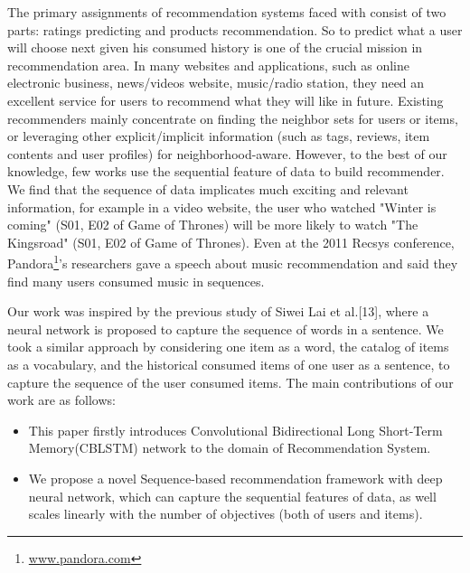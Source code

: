 \documentclass[runningheads]{llncs}
\begin{document}
The primary assignments of recommendation systems faced with consist of two parts: ratings predicting and products recommendation. So to predict what a user will choose next given his consumed history is one of the crucial mission \cite{15} in recommendation area. In many websites and applications, such as online electronic business, news/videos website, music/radio station, they need an excellent service for users to recommend what they will like in future. Existing recommenders mainly concentrate on finding the neighbor sets for users or items, or leveraging other explicit/implicit information (such as tags, reviews, item contents and user profiles) for neighborhood-aware. However, to the best of our knowledge, few works use the sequential feature of data to build recommender. We find that the sequence of data implicates much exciting and relevant information, for example in a video website, the user who watched "Winter is coming" (S01, E02 of Game of Thrones) will be more likely to watch "The Kingsroad" (S01, E02 of Game of Thrones). Even at the 2011 Recsys conference, Pandora\footnote{\url{www.pandora.com}}'s researchers gave a speech about music recommendation and said they find many users consumed music in sequences.

Our work was inspired by the previous study of Siwei Lai et al.[13], where a neural network is proposed to capture the sequence of words in a sentence.  We took a similar approach by considering one item as a word, the catalog of items as a vocabulary, and the historical consumed items of one user as a sentence, to capture the sequence of the user consumed items. The main contributions of our work are as follows:
 \begin{itemize}
\item This paper firstly introduces Convolutional Bidirectional Long Short-Term Memory(CBLSTM) network to the domain of Recommendation System. 
\item We propose a novel Sequence-based recommendation framework with deep neural network, which can capture the sequential features of data, as well scales linearly with the number of objectives (both of users and items).
 \end{itemize}

\end{document}
